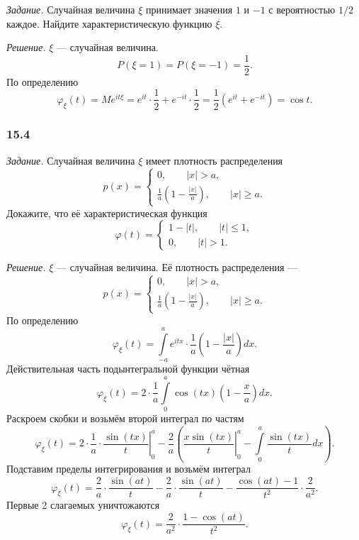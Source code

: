\textit{Задание.} Случайная величина $ \xi $ принимает значения $1$ и $- 1$ с вероятностью $1 / 2$ каждое.
Найдите характеристическую функцию $ \xi $.

\textit{Решение.} $ \xi $ --- случайная величина.
$$P \left( \xi = 1 \right) =
P \left( \xi = - 1 \right) =
\frac{1}{2}.$$
По определению
$$ \varphi_{ \xi } \left( t \right) =
Me^{it \xi } =
e^{it} \cdot \frac{1}{2} + e^{- it} \cdot \frac{1}{2} =
\frac{1}{2} \left( e^{it} + e^{- it} \right) =
\cos t.$$

\subsubsection*{15.4}

\textit{Задание.} Случайная величина $ \xi $ имеет плотность распределения
$$p \left( x \right) =
\begin{cases}
0, \qquad \left| x \right| > a, \\
\frac{1}{a} \left( 1 - \frac{ \left| x \right| }{a} \right), \qquad \left| x \right| \geq a.
\end{cases}$$
Докажите, что её характеристическая функция
$$ \varphi \left( t \right) =
\begin{cases}
1 - \left| t \right|, \qquad \left| t \right| \leq 1, \\
0, \qquad \left| t \right| > 1.
\end{cases}$$

\textit{Решение.} $ \xi $ --- случайная величина.
Её плотность распределения ---
$$p \left( x \right) =
\begin{cases}
0, \qquad \left| x \right| > a, \\
\frac{1}{a} \left( 1 - \frac{ \left| x \right| }{a} \right), \qquad \left| x \right| \geq a.
\end{cases}$$
По определению
$$ \varphi_{ \xi } \left( t \right) =
\int \limits_{- a}^a e^{itx} \cdot \frac{1}{a} \left( 1 - \frac{ \left| x \right| }{a} \right) dx.$$
Действительная часть подынтегральной функции чётная
$$ \varphi_{ \xi } \left( t \right) =
2 \cdot \frac{1}{a} \int \limits_0^a \cos \left( tx \right) \left( 1 - \frac{x}{a} \right) dx.$$
Раскроем скобки и возьмём второй интеграл по частям
$$ \varphi_{ \xi } \left( t \right) =
\left. 2 \cdot \frac{1}{a} \cdot \frac{ \sin \left( tx \right) }{t} \right|_0^a -
\frac{2}{a} \left( \left. \frac{x \sin \left( tx \right) }{t} \right|_0^a - \int \limits_0^a \frac{ \sin \left( tx \right) }{t} dx \right).$$
Подставим пределы интегрирования и возьмём интеграл
$$ \varphi_{ \xi } \left( t \right) =
\frac{2}{a} \cdot \frac{ \sin \left( at \right) }{t} - \frac{2}{a} \cdot \frac{ \sin \left( at \right) }{t} - \frac{ \cos \left( at \right) - 1}{t^2} \cdot \frac{2}{a^2}.$$
Первые 2 слагаемых уничтожаются
$$ \varphi_{ \xi } \left( t \right) =
\frac{2}{a^2} \cdot \frac{1 - \cos \left( at \right) }{t^2}.$$

